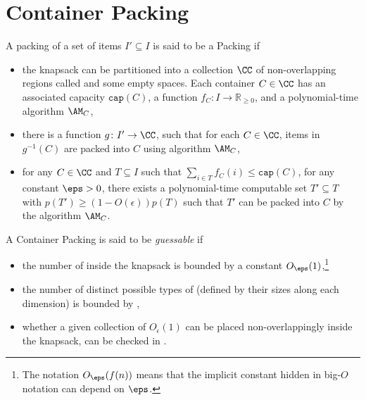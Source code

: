 \section{Container Packing}
\label{subsec:cp}
\begin{definition}
    A packing of a set of items $I' \subseteq I$ is said to be a \Container Packing if 
    \begin{itemize}
        \item the knapsack can be partitioned into a collection $\CC$ of non-overlapping regions called \boxes and some empty spaces. Each container $C \in \CC$ has an associated capacity $\mathtt{cap}(C)$, a function $f_C \colon I \rightarrow \mathbb{R}_{\ge 0}$, and a polynomial-time algorithm $\AM_C$,
        \item there is a function $g \colon I' \rightarrow \CC$, such that for each $C\in \CC$, items in $g^{-1}(C)$ are packed into $C$ using algorithm $\AM_C$,
        \item for any $C\in \CC$ and $T\subseteq I$ such that $\sum_{i\in T} f_C(i) \le \mathtt{cap}(C)$, for any constant $\eps > 0$, there exists a polynomial-time computable set $T' \subseteq T$ with $p(T')\ge (1-O(\epsilon))p(T)$ such that $T'$ can be packed into $C$ by the algorithm $\AM_C$. 
    \end{itemize}
\end{definition}

A Container Packing is said to be \textit{guessable} if 
\begin{itemize}
    \item the number of \boxes inside the knapsack is bounded by a constant $O_\eps(1)$,\footnote{The notation $O_{\eps}(f(n))$ means that the implicit constant hidden in big-$O$ notation can depend on $\eps$.}
    \item the number of distinct possible types of \boxes (defined by their sizes along each dimension) is bounded by ,
    \item whether a given collection of $O_{\epsilon}(1)$ \boxes can be placed non-overlappingly inside the knapsack, can be checked in .
\end{itemize}

